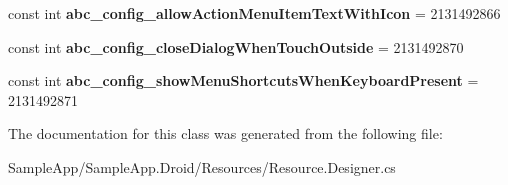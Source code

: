 \begin{DoxyCompactItemize}
const int {\bfseries abc\+\_\+config\+\_\+allow\+Action\+Menu\+Item\+Text\+With\+Icon} = 2131492866
\item 
\mbox{\label{class_sample_app_1_1_droid_1_1_resource_1_1_boolean_ad8d7b5a9116315456c623721ef8f84a1}} 
const int {\bfseries abc\+\_\+config\+\_\+close\+Dialog\+When\+Touch\+Outside} = 2131492870
\item 
\mbox{\label{class_sample_app_1_1_droid_1_1_resource_1_1_boolean_a1e3b592ea7ec98de28ee3ba5274c8e63}} 
const int {\bfseries abc\+\_\+config\+\_\+show\+Menu\+Shortcuts\+When\+Keyboard\+Present} = 2131492871
\end{DoxyCompactItemize}


The documentation for this class was generated from the following file\+:\begin{DoxyCompactItemize}
\item 
Sample\+App/\+Sample\+App.\+Droid/\+Resources/Resource.\+Designer.\+cs\end{DoxyCompactItemize}
